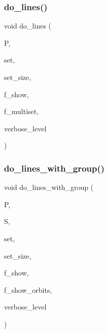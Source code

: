 \subsubsection{\texorpdfstring{do\+\_\+lines()}{do\_lines()}}
{\footnotesize\ttfamily void do\+\_\+lines (\begin{DoxyParamCaption}\item[{\mbox{\hyperlink{classprojective__space}{projective\+\_\+space}} $\ast$}]{P,  }\item[{\mbox{\hyperlink{galois_8h_a09fddde158a3a20bd2dcadb609de11dc}{I\+NT}} $\ast$}]{set,  }\item[{\mbox{\hyperlink{galois_8h_a09fddde158a3a20bd2dcadb609de11dc}{I\+NT}}}]{set\+\_\+size,  }\item[{\mbox{\hyperlink{galois_8h_a09fddde158a3a20bd2dcadb609de11dc}{I\+NT}}}]{f\+\_\+show,  }\item[{\mbox{\hyperlink{galois_8h_a09fddde158a3a20bd2dcadb609de11dc}{I\+NT}}}]{f\+\_\+multiset,  }\item[{\mbox{\hyperlink{galois_8h_a09fddde158a3a20bd2dcadb609de11dc}{I\+NT}}}]{verbose\+\_\+level }\end{DoxyParamCaption})}

\mbox{\label{analyze_8_c_a4d2121c8336b649f26cd4627244cc6ce}} 
\subsubsection{\texorpdfstring{do\+\_\+lines\+\_\+with\+\_\+group()}{do\_lines\_with\_group()}}
{\footnotesize\ttfamily void do\+\_\+lines\+\_\+with\+\_\+group (\begin{DoxyParamCaption}\item[{\mbox{\hyperlink{classprojective__space}{projective\+\_\+space}} $\ast$}]{P,  }\item[{\mbox{\hyperlink{classsims}{sims}} $\ast$}]{S,  }\item[{\mbox{\hyperlink{galois_8h_a09fddde158a3a20bd2dcadb609de11dc}{I\+NT}} $\ast$}]{set,  }\item[{\mbox{\hyperlink{galois_8h_a09fddde158a3a20bd2dcadb609de11dc}{I\+NT}}}]{set\+\_\+size,  }\item[{\mbox{\hyperlink{galois_8h_a09fddde158a3a20bd2dcadb609de11dc}{I\+NT}}}]{f\+\_\+show,  }\item[{\mbox{\hyperlink{galois_8h_a09fddde158a3a20bd2dcadb609de11dc}{I\+NT}}}]{f\+\_\+show\+\_\+orbits,  }\item[{\mbox{\hyperlink{galois_8h_a09fddde158a3a20bd2dcadb609de11dc}{I\+NT}}}]{verbose\+\_\+level }\end{DoxyParamCaption})}


